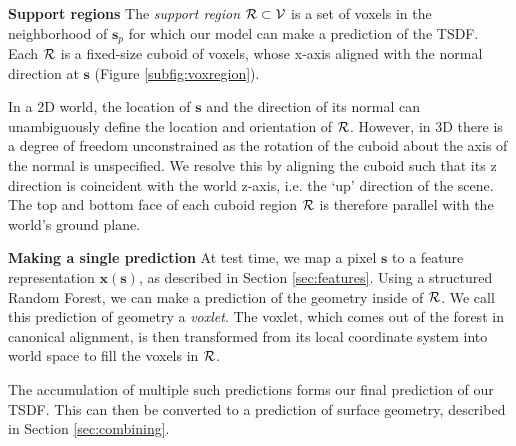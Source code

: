 \documentclass[10pt,twocolumn,letterpaper]{article}
\makeatletter
\renewcommand*{\ie}{i.e.\@\xspace}
\newcommand{\feat}{\mathbf{x}}
\newcommand{\pixelidx}{\mathbf{s}}
\newcommand{\voxelgrid}{\mathcal{V}}
\newcommand{\project}{\mathbf{p}}
\newcommand{\todo}[1]{\textcolor{red}{TODO: #1}}
\newcommand{\note}[1]{\textcolor{blue}{NOTE: #1}}
\renewcommand{\paragraph}{\vspace{2pt}\noindent\textbf}
\makeatother
\begin{document}
\paragraph{Support regions}
The \emph{support region} $\voxregion \subset \voxelgrid$ is a set of voxels in the neighborhood of $\pixelidx_p$ for which our model can make a prediction of the TSDF.
Each $\mathcal{R}$ is a fixed-size cuboid of voxels, whose x-axis aligned with the normal direction at $\pixelidx$ (Figure \ref{subfig:voxregion}).

In a 2D world, the location of $\pixelidx$ and the direction of its normal can unambiguously define the location and orientation of $\mathcal{R}$.
However, in 3D there is a degree of freedom unconstrained as the rotation of the cuboid about the axis of the normal is unspecified.
We resolve this by aligning the cuboid such that its z direction is coincident with the world z-axis, \ie the `up' direction of the scene.
The top and bottom face of each cuboid region $\mathcal{R}$ is therefore parallel with the world's ground plane.


\paragraph{Making a single prediction}
At test time, we map a pixel $\pixelidx$ to a feature representation $\feat(\pixelidx)$, as described in Section \ref{sec:features}.
Using a structured Random Forest, we can make a prediction of the geometry inside of $\mathcal{R}$.
We call this prediction of geometry a \emph{voxlet}.
The voxlet, which comes out of the forest in canonical alignment, is then transformed from its local coordinate system into world space to fill the voxels in $\mathcal{R}$.

The accumulation of multiple such predictions forms our final prediction of our TSDF.
This can then be converted to a prediction of surface geometry, described in Section \ref{sec:combining}.

\end{document}

